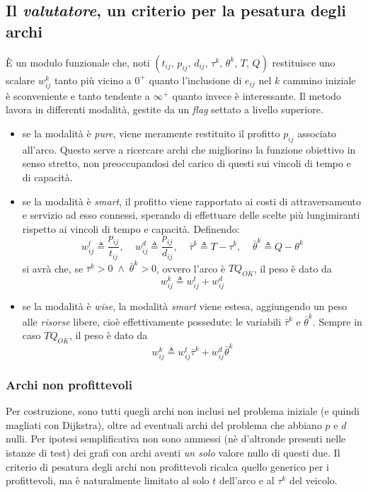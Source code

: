 \subsection{Il \emph{valutatore}, un criterio per la pesatura degli archi} %
\label{subsec:eval}
	È un modulo funzionale che, noti $(t_{ij},\,p_{ij},\,d_{ij},\,\tau^k,\,\theta^k,\,T,\,Q)$ restituisce uno scalare $w_{ij}^k$ tanto più vicino a $0^+$ 
	quanto l'inclusione di $e_{ij}$ nel $k$ cammino iniziale è sconveniente e tanto tendente a $\infty^+$ quanto invece è interessante. 
	Il metodo lavora in differenti modalità, gestite da un \emph{flag} settato a livello superiore.
	\begin{itemize}
	  \item se la modalità è \emph{pure}, viene meramente restituito il profitto $p_{ij}$ associato all'arco. Questo serve a ricercare archi che migliorino
	  	    la funzione obiettivo in senso stretto, non preoccupandosi del carico di questi sui vincoli di tempo e di capacità.
	  \item se la modalità è \emph{smart}, il profitto viene rapportato ai costi di attraversamento e servizio ad esso connessi, 
		  	sperando di effettuare delle scelte più lungimiranti rispetto ai vincoli di tempo e capacità. Definendo:
			$$w_{ij}^t \triangleq \frac{p_{ij}}{t_{ij}},\;\;\;\; w_{ij}^d \triangleq \frac{p_{ij}}{d_{ij}},\;\;\;\; 
			\bar{\tau}^k \triangleq T-\tau^k,\;\;\;\; \bar{\theta}^k \triangleq Q-\theta^k$$
			si avrà che, se $\bar{\tau}^k > 0\; \wedge\; \bar{\theta}^k > 0$, ovvero l'arco è $TQ_{OK}$, il peso è dato da
			$$w_{ij}^k \triangleq w_{ij}^t + w_{ij}^d$$
	  \item se la modalità è \emph{wise}, la modalità \emph{smart} viene estesa, aggiungendo un peso alle \emph{risorse} libere, cioè effettivamente possedute:
	  		le variabili $\bar{\tau}^k$ e $\bar{\theta}^k$. Sempre in caso $TQ_{OK}$, il peso è dato da
			$$w_{ij}^k \triangleq w_{ij}^t \bar{\tau}^k + w_{ij}^d \bar{\theta}^k$$  		
	\end{itemize}
	\subsubsection{Archi non profittevoli}
	Per costruzione, sono tutti quegli archi non inclusi nel problema iniziale (e quindi magliati con Dijkstra), oltre ad eventuali archi del problema che
	abbiano $p$ e $d$ nulli. Per ipotesi semplificativa non sono ammessi (nè d'altronde presenti nelle istanze di test) dei grafi con archi aventi \emph{un solo}
	valore nullo di questi due. Il criterio di pesatura degli archi non profittevoli ricalca quello generico per i profittevoli, ma è naturalmente limitato al solo $t$
	dell'arco e al $\tau^k$ del veicolo.
	
